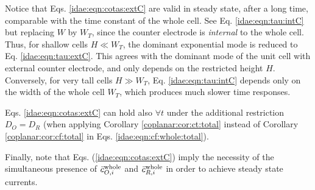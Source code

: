 Notice that Eqs. \eqref{idae:eqn:cotas:extC} are valid in steady state,
after a long time, comparable with the time constant of the whole cell.
See Eq. \eqref{idae:eqn:tau:intC} but replacing $W$ by $W_{T}$,
since the counter electrode is \emph{internal} to the whole cell.
Thus, for shallow cells $H \ll W_{T}$,
the dominant exponential mode is reduced to Eq. \eqref{idae:eqn:tau:extC}.
This agrees with the dominant mode of the unit cell with external counter electrode,
and only depends on the restricted height $H$.
Conversely, for very tall cells $H \gg W_{T}$,
Eq. \eqref{idae:eqn:tau:intC} depends only on the width of the whole cell $W_{T}$,
which produces much slower time responses.

Eqs. \eqref{idae:eqn:cotas:extC} can hold also $\forall t$
under the additional restriction $D_{O} = D_{R}$
(when applying Corollary \ref{coplanar:cor:ct:total}
instead of Corollary \ref{coplanar:cor:cf:total}
in Eqs. \eqref{idae:eqn:cf:whole:total}).

Finally, note that Eqs. (\ref{idae:eqn:cotas:extC}) imply the necessity of
the simultaneous presence of $\bar{c}_{O,i}^{\text{whole}}$ and $\bar{c}_{R,i}^{\text{whole}}$
in order to achieve steady state currents.

